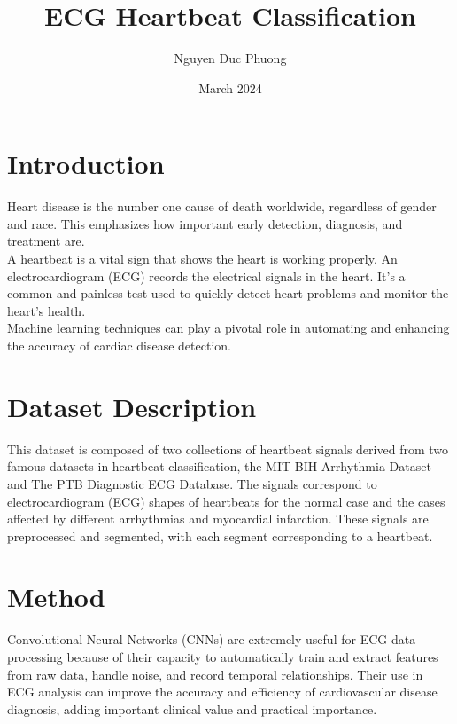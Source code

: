 \documentclass[conference]{article}
\title{ECG Heartbeat Classification}
\author{Nguyen Duc Phuong}
\date{March 2024}
\begin{document}
\maketitle

\section{Introduction}

Heart disease is the number one cause of death worldwide, regardless of gender and race. This emphasizes how important early detection, diagnosis, and treatment are. \\


A heartbeat is a vital sign that shows the heart is working properly. An electrocardiogram (ECG) records the electrical signals in the heart. It's a common and painless test used to quickly detect heart problems and monitor the heart's health. \\

Machine learning techniques can play a pivotal role in automating and enhancing the accuracy of cardiac disease detection. \\

\section{Dataset Description}

This dataset is composed of two collections of heartbeat signals derived from two famous datasets in heartbeat classification, the MIT-BIH Arrhythmia Dataset and The PTB Diagnostic ECG Database. The signals correspond to electrocardiogram (ECG) shapes of heartbeats for the normal case and the cases affected by different arrhythmias and myocardial infarction. These signals are preprocessed and segmented, with each segment corresponding to a heartbeat.


\section{Method}

Convolutional Neural Networks (CNNs) are extremely useful for ECG data processing because of their capacity to automatically train and extract features from raw data, handle noise, and record temporal relationships. Their use in ECG analysis can improve the accuracy and efficiency of cardiovascular disease diagnosis, adding important clinical value and practical importance. \\
\end{document}

